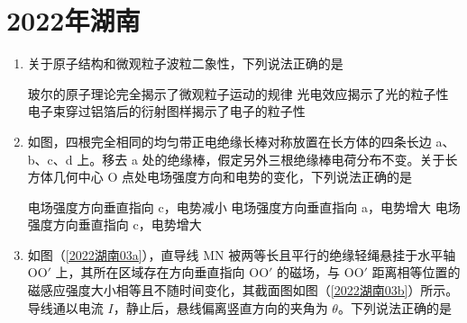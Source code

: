 \documentclass[\gkver]{gaokaozhenti}
\begin{document}
\chapter{2022年湖南}

\begin{enumerate}
\item
关于原子结构和微观粒子波粒二象性，下列说法正确的是

{玻尔的原子理论完全揭示了微观粒子运动的规律}
{光电效应揭示了光的粒子性}
{电子束穿过铝箔后的衍射图样揭示了电子的粒子性}


\item
如图，四根完全相同的均匀带正电绝缘长棒对称放置在长方体的四条长边 a、b、c、d 上。移去 a 处的绝缘棒，假定另外三根绝缘棒电荷分布不变。关于长方体几何中心 O 点处电场强度方向和电势的变化，下列说法正确的是


{电场强度方向垂直指向 c，电势减小}
{电场强度方向垂直指向 a，电势增大}
{电场强度方向垂直指向 c，电势增大}


\item
如图（\ref{2022湖南03a}），直导线 MN 被两等长且平行的绝缘轻绳悬挂于水平轴 OO$'$ 上，其所在区域存在方向垂直指向 OO$'$ 的磁场，与 OO$'$ 距离相等位置的磁感应强度大小相等且不随时间变化，其截面图如图（\ref{2022湖南03b}）所示。导线通以电流 $I$，静止后，悬线偏离竖直方向的夹角为 $\theta$。下列说法正确的是


\end{enumerate}
\end{document}
